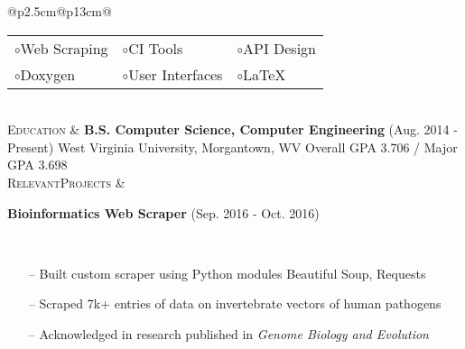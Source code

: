 \documentclass{article}
\begin{document}
\begin{tabular}{@{}p{2.5cm}@{\hspace{0.2cm}}p{13cm}@{}}
\begin{tabular}{@{}lll@{}}
$\circ$\enspace Web Scraping &
$\circ$\enspace CI Tools &
$\circ$\enspace API Design \\

$\circ$\enspace Doxygen &
$\circ$\enspace User Interfaces &
$\circ$\enspace \LaTeX \\

\end{tabular} \\


\enspace\textsc{Education} &
\enspace\textbf{B.S. Computer Science, Computer Engineering}
\hfill\small(Aug. 2014 - Present)\normalsize
\newline West Virginia University, Morgantown, WV \small
\newline Overall GPA 3.706 / Major GPA 3.698
\normalsize \\


\enspace\textsc{Relevant}\newline\textsc{Projects} &

\enspace\textbf{Bioinformatics Web Scraper}
\hfill\small(Sep. 2016 - Oct. 2016)\normalsize
\par\,\small
\begin{itemize}[leftmargin=*,nolistsep,noitemsep]
  \item[--]Built custom scraper using Python modules Beautiful Soup, Requests
  \item[--]Scraped 7k+ entries of data on invertebrate vectors of human pathogens
  \item[--]Acknowledged in research published in \textit{Genome Biology and Evolution}
\end{itemize} \\
\normalsize

\end{tabular}
\end{document}
